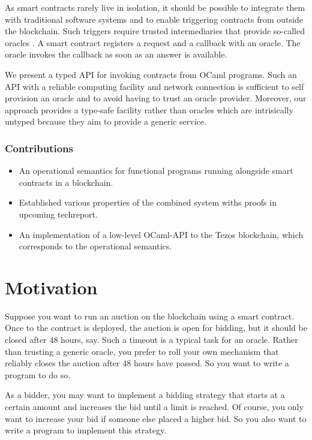 \documentclass[a4paper]{llncs}
\begin{document}
As smart contracts rarely live in isolation, it should be possible to
integrate them with traditional software systems and to enable
triggering contracts from outside the blockchain. Such triggers
require trusted intermediaries that provide so-called oracles \cite{oracle-patterns,call-action-oracle}. A
smart contract registers a request and a callback with an oracle. The
oracle invokes the callback as soon as an answer is available. 

We present a typed API for invoking contracts from OCaml
programs. Such an API with a reliable computing facility and network
connection is sufficient to self provision an oracle and to avoid
having to trust an oracle provider. Moreover, our approach provides a
type-safe facility rather than oracles which are intrisically untyped
because they aim to provide a generic service.

\subsubsection{Contributions}
\label{sec:contributions}

\begin{itemize}
\item An operational semantics for functional programs running
  alongside smart contracts in a blockchain. 
\item Established various properties of the combined system withs
  proofs in upcoming techreport.
\item An implementation of a low-level OCaml-API to the Tezos
  blockchain, which corresponds to the operational semantics.
\end{itemize}

\section{Motivation}
\label{sec:motivation}

Suppose you want to run an auction on the blockchain using a smart
contract. Once to the contract is deployed, the
auction is open for bidding, but it should be closed after 48 hours,
say. Such a timeout is a typical task for an oracle. Rather than
trusting a generic oracle, you prefer to roll your own mechanism that reliably closes the auction
after 48 hours have passed. So you want to write a program to do so. 

As a bidder, you may want to implement a bidding
strategy that starts at a certain amount and increases the bid until a
limit is reached. Of course, you only want to increase your bid if
someone else placed a higher bid. So you also want to write a
program to implement this strategy.
\end{document}
